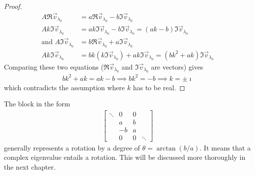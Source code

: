 \begin{proof}
{\begin{align*}
A\Re{\vec{v}_{\lambda_0}} &= a\Re{\vec{v}_{\lambda_0}} - b\Im{\vec{v}_{\lambda_0}} \\
Ak\Im{\vec{v}_{\lambda_0}} &= ak\Im{\vec{v}_{\lambda_0}} - b\Im{\vec{v}_{\lambda_0}} = (ak-b)\Im{\vec{v}_{\lambda_0}} \\
\text{and } A\Im{\vec{v}_{\lambda_0}} &= b\Re{\vec{v}_{\lambda_0}} + a\Im{\vec{v}_{\lambda_0}} \\
Ak \Im{\vec{v}_{\lambda_0}} &= bk(k\Im{\vec{v}_{\lambda_0}}) + ak\Im{\vec{v}_{\lambda_0}} = (bk^2 + ak)\Im{\vec{v}_{\lambda_0}}
\end{align*}
Comparing these two equations ($\Re{\vec{v}_{\lambda_0}}$ and $\Im{\vec{v}_{\lambda_0}}$ are  vectors) gives
\begin{align*}
bk^2 + ak = ak - b \implies bk^2 = -b \implies k = \pm \imath
\end{align*}
which contradicts the assumption where $k$ has to be real.}
\end{proof}

The block in the form
\begin{align*}
\begin{bmatrix}
\ddots & 0 & 0 & \\
& a & b & \\
& -b & a & \\
& 0 & 0 & \ddots
\end{bmatrix}    
\end{align*}
generally represents a rotation by a degree of $\theta = \arctan(b/a)$. It means that a complex eigenvalue entails a rotation. This will be discussed more thoroughly in the next chapter.

